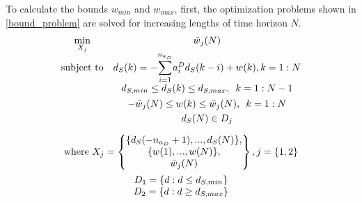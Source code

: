 \documentclass[letterpaper, 10 pt, conference]{ieeeconf}  %
\begin{document}
	To calculate the bounds $w_{min}$ and $w_{max}$, first, the optimization problems shown in \eqref{bound_problem} are solved for increasing lengths of time horizon $N$.
	\begin{equation}
	\begin{matrix}
	\begin{matrix}
	\underset{X_{j}}{\text{min}}
	& \bar{w}_j(N) \\
	\text{subject to}
	& 
	d_S(k) = -\mathlarger{\sum\limits_{i=1}^{n_{a_D}}}a_i^Dd_S(k-i) + w(k), k={1:N}\\
	&  d_{S,min} \leq d_S(k) \leq d_{S,max}, \hspace{5pt} k={1:N-1} \vspace{4pt}\\
	&  -\bar{w}_j(N) \leq w(k) \leq \bar{w}_j(N), \hspace{5pt} k={1:N} \vspace{3pt}\\
	&  d_S(N) \in D_j 
	\end{matrix}
	\vspace{10pt} \\
	\text{where } X_j = 
	\begin{Bmatrix}
	\{d_S(-n_{a_D}+1),...,d_S(N)\},\\
	\{w(1),...,w(N)\},\vspace{0.001cm}\\
	\bar{w}_j(N)
	\end{Bmatrix}, j=\{1,2\}
	\vspace{5pt}\\
	\begin{matrix}
	D_1 = \{d:d \leq d_{S,min}\}\\
	D_2 = \{d:d \geq d_{S,max}\}
	\end{matrix}
	\end{matrix}
	\label{bound_problem}
	\end{equation}
	
\end{document}
